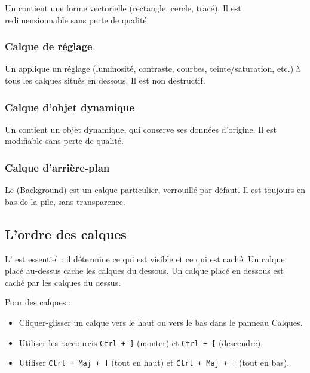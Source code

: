 Un  contient une forme vectorielle (rectangle, cercle, tracé). Il est redimensionnable sans perte de qualité.

\subsubsection{Calque de réglage}

Un  applique un réglage (luminosité, contraste, courbes, teinte/saturation, etc.) à tous les calques situés en dessous. Il est non destructif.

\subsubsection{Calque d'objet dynamique}

Un  contient un objet dynamique, qui conserve ses données d'origine. Il est modifiable sans perte de qualité.

\subsubsection{Calque d'arrière-plan}

Le  (Background) est un calque particulier, verrouillé par défaut. Il est toujours en bas de la pile, sans transparence.

\subsection{L'ordre des calques}

L' est essentiel : il détermine ce qui est visible et ce qui est caché. Un calque placé au-dessus cache les calques du dessous. Un calque placé en dessous est caché par les calques du dessus.

Pour  des calques :

\begin{itemize}
    \item Cliquer-glisser un calque vers le haut ou vers le bas dans le panneau Calques.
    \item Utiliser les raccourcis \texttt{Ctrl + ]} (monter) et \texttt{Ctrl + [} (descendre).
    \item Utiliser \texttt{Ctrl + Maj + ]} (tout en haut) et \texttt{Ctrl + Maj + [} (tout en bas).
\end{itemize}

